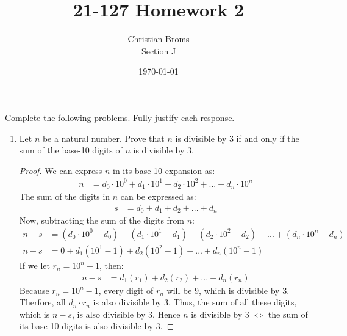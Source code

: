 \documentclass[12pt]{article}
\begin{document}
\title{21-127 Homework 2}
\author{Christian Broms \\ Section J}
\date{\today}
\maketitle
Complete the following problems. Fully justify each response.

\begin{enumerate}

\item Let $n$ be a natural number. Prove that $n$ is divisible by 3 if and only if the sum of the base-10 digits of $n$ is divisible by 3.
\begin{proof}
We can express $n$ in its base 10 expansion as:
\begin{align*}
n &= d_0\cdot10^0 + d_1\cdot10^1 + d_2\cdot10^2 + ... + d_n\cdot10^n
\end{align*}
The sum of the digits in $n$ can be expressed as: 
\begin{align*}
s &= d_0 + d_1 + d_2 + ... + d_n
\end{align*}
Now, subtracting the sum of the digits from $n$:
\begin{align*}
n - s &= (d_0\cdot10^0 - d_0) + (d_1\cdot10^1 - d_1) + (d_2\cdot10^2 - d_2) + ... + (d_n\cdot10^n - d_n) \\
n - s &= 0 + d_1(10^1 - 1) + d_2(10^2 - 1) + ... + d_n(10^n - 1)
\end{align*}
If we let $r_n = 10^n - 1$, then:
\begin{align*}
n - s &= d_1(r_1) + d_2(r_2) + ... + d_n(r_n)
\end{align*}
Because $r_n = 10^n - 1$, every digit of $r_n$ will be 9, which is divisible by 3. Therfore, all $d_n \cdot r_n$ is also divisible by 3. Thus, the sum of all these digits, which is $n - s$, is also divisible by 3. Hence $n$ is divisible by 3 $\iff$ the sum of its base-10 digits is also divisible by 3.


\end{proof}
\end{enumerate}
\end{document}
